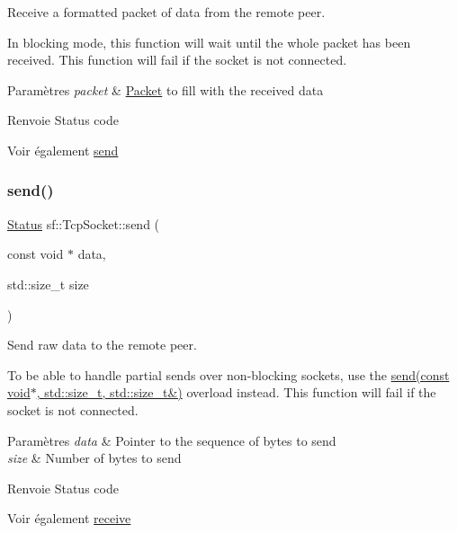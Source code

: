 Receive a formatted packet of data from the remote peer. 

In blocking mode, this function will wait until the whole packet has been received. This function will fail if the socket is not connected.


\begin{DoxyParams}{Paramètres}
{\em packet} & \hyperlink{classsf_1_1Packet}{Packet} to fill with the received data\\
\hline
\end{DoxyParams}
\begin{DoxyReturn}{Renvoie}
Status code
\end{DoxyReturn}
\begin{DoxySeeAlso}{Voir également}
\hyperlink{classsf_1_1TcpSocket_affce26ab3bcc4f5b9269dad79db544c0}{send} 
\end{DoxySeeAlso}
\mbox{\label{classsf_1_1TcpSocket_affce26ab3bcc4f5b9269dad79db544c0}} 
\subsubsection{\texorpdfstring{send()}{send()}\hspace{0.1cm}{\footnotesize\ttfamily [1/3]}}
{\footnotesize\ttfamily \hyperlink{classsf_1_1Socket_a51bf0fd51057b98a10fbb866246176dc}{Status} sf\+::\+Tcp\+Socket\+::send (\begin{DoxyParamCaption}\item[{const void $\ast$}]{data,  }\item[{std\+::size\+\_\+t}]{size }\end{DoxyParamCaption})}



Send raw data to the remote peer. 

To be able to handle partial sends over non-\/blocking sockets, use the \hyperlink{classsf_1_1TcpSocket_a31f5b280126a96c6f3ad430f4cbcb54d}{send(const void$\ast$, std\+::size\+\_\+t, std\+::size\+\_\+t\&)} overload instead. This function will fail if the socket is not connected.


\begin{DoxyParams}{Paramètres}
{\em data} & Pointer to the sequence of bytes to send \\
\hline
{\em size} & Number of bytes to send\\
\hline
\end{DoxyParams}
\begin{DoxyReturn}{Renvoie}
Status code
\end{DoxyReturn}
\begin{DoxySeeAlso}{Voir également}
\hyperlink{classsf_1_1TcpSocket_a90ce50811ea61d4f00efc62bb99ae1af}{receive} 
\end{DoxySeeAlso}
\mbox{\label{classsf_1_1TcpSocket_a31f5b280126a96c6f3ad430f4cbcb54d}} 
